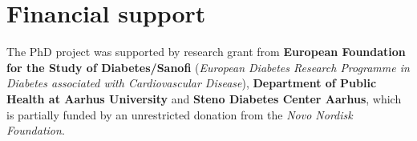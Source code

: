 \documentclass[
  a4paper,
  headsepline=true,
  open=left]{scrbook}
\begin{document}
\hypertarget{financial-support}{%
\chapter*{Financial support}\label{financial-support}}


The PhD project was supported by research grant from \textbf{European
Foundation for the Study of Diabetes/Sanofi} (\emph{European Diabetes
Research Programme in Diabetes associated with Cardiovascular Disease}),
\textbf{Department of Public Health at Aarhus University} and
\textbf{Steno Diabetes Center Aarhus}, which is partially funded by an
unrestricted donation from the \emph{Novo Nordisk Foundation}.
\end{document}
